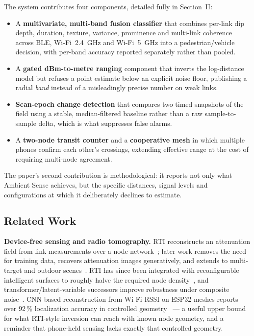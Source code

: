\documentclass[journal,10pt]{IEEEtran}
\begin{document}
The system contributes four components, detailed fully in Section~II:
\begin{itemize}
  \item A \textbf{multivariate, multi-band fusion classifier} that combines
  per-link dip depth, duration, texture, variance, prominence and multi-link
  coherence across BLE, Wi-Fi~2.4~GHz and Wi-Fi~5~GHz into a
  pedestrian/vehicle decision, with per-band accuracy reported separately
  rather than pooled.
  \item A \textbf{gated dBm-to-metre ranging} component that inverts the
  log-distance model but refuses a point estimate below an explicit noise
  floor, publishing a radial \emph{band} instead of a misleadingly precise
  number on weak links.
  \item \textbf{Scan-epoch change detection} that compares two timed
  snapshots of the field using a stable, median-filtered baseline rather than
  a raw sample-to-sample delta, which is what suppresses false alarms.
  \item A \textbf{two-node transit counter} and a \textbf{cooperative mesh}
  in which multiple phones confirm each other's crossings, extending
  effective range at the cost of requiring multi-node agreement.
\end{itemize}
The paper's second contribution is methodological: it reports not only what
Ambient Sense achieves, but the specific distances, signal levels and
configurations at which it deliberately declines to estimate.

\subsection{Related Work}
\textbf{Device-free sensing and radio tomography.} RTI reconstructs an
attenuation field from link measurements over a node
network~\cite{wilson2010}; later work removes the need for training data,
recovers attenuation images generatively, and extends to multi-target and
outdoor scenes~\cite{alippi2016,wu2024}. RTI has since been integrated with
reconfigurable intelligent surfaces to roughly halve the required node
density~\cite{li2024}, and transformer/latent-variable successors improve
robustness under composite noise~\cite{wu2024}. CNN-based reconstruction from
Wi-Fi RSSI on ESP32 meshes reports over 92\,\% localization accuracy in
controlled geometry~\cite{cnnrti2025} --- a useful upper bound for what
RTI-style inversion can reach with known node geometry, and a reminder that
phone-held sensing lacks exactly that controlled geometry.
\end{document}
